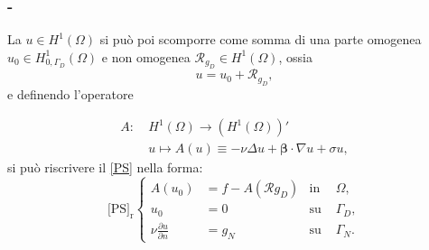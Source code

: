\documentclass[11pt]{beamer}
\newcommand{\derP}[2]{\frac{\partial#1}{\partial#2}}
\newcommand{\SpaziaturaMate}[3]{
    \setlength{\thinmuskip}{#1mu}
    \setlength{\medmuskip}{#2mu}
    \setlength{\thickmuskip}{#3mu}
}
\newcommand{\teqref}[2]{\hyperref[#1]{#2}}
\begin{document}
            \begin{frame}\frametitle{\insertpart{} - \insertsection{}}
                {\SpaziaturaMate{1}{2}{3}
                La $u\!\in\!H^1(\Omega)$ si può poi scomporre come somma di una parte omogenea $u_0\!\in\!H^1_{0,\Gamma_D}(\Omega)$ e non omogenea $\mathcal R_{g_D}\!\in\!H^1(\Omega)$, ossia
                \begin{equation*}
                    u=u_0+\mathcal R_{g_D},
                \end{equation*}
                e definendo l'operatore}
                \begin{equation*}
                    \begin{aligned}
                        A:\ &H^1(\Omega)\rightarrow(H^1(\Omega))'\\
                        &u\mapsto A(u)\equiv-\nu\Delta u+
                        \boldsymbol\beta\cdot\nabla u+\sigma u,
                    \end{aligned}
                    \label{eqOperatorePS}
                \end{equation*}
                si può riscrivere il \teqref{eqProblemaStazionario}{[PS]} nella forma: 
                 \begin{equation}
                    \text{[PS]}_\text{r}
                    \left\{
                    \begin{aligned}
                        A(u_0)&=f-A(\mathcal Rg_D)&\text{in }&\Omega,\\
                                  u_0&=0 &\text{su }&\Gamma_D,\\
                        \nu\derP un&=g_N &\text{su }&\Gamma_N. 
                    \end{aligned}
                    \right.
                    \label{eqPSRiformulato}
                \end{equation}

            \end{frame}
    
\end{document}
